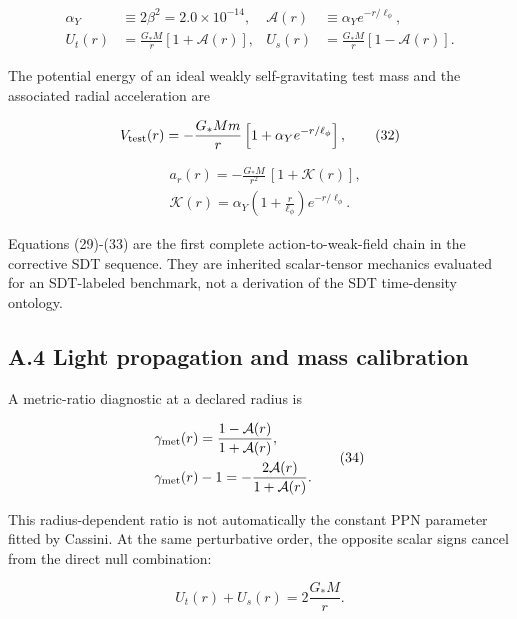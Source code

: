 \documentclass[
  american,
  11pt,
  letterpaper,
]{article}
\begin{document}
\[
\begin{aligned}
\alpha_Y&\equiv2\beta^2=2.0\times10^{-14},
&
\mathcal A(r)&\equiv\alpha_Y e^{-r/\ell_\phi},\\
U_t(r)&=\frac{G_*M}{r}[1+\mathcal A(r)],
&
U_s(r)&=\frac{G_*M}{r}[1-\mathcal A(r)].
\end{aligned}
\tag{31}
\]

The potential energy of an ideal weakly self-gravitating test mass and the associated radial acceleration are

\begin{equation}
V_{\rm test}(r)
=-\frac{G_*Mm}{r}\left[1+\alpha_Ye^{-r/\ell_\phi}\right],
\tag{32}
\end{equation}

\begin{equation}
\begin{aligned}
& a_r(r)
=-\frac{G_*M}{r^2}\,[1+\mathcal K(r)], \\
& \mathcal K(r)
=\alpha_Y\left(1+\frac{r}{\ell_\phi}\right)e^{-r/\ell_\phi}.
\end{aligned}
\tag{33}
\end{equation}

Equations (29)-(33) are the first complete action-to-weak-field chain in the corrective SDT sequence. They are inherited scalar-tensor mechanics evaluated for an SDT-labeled benchmark, not a derivation of the SDT time-density ontology.

\subsection{A.4 Light propagation and mass calibration}\label{a.4-light-propagation-and-mass-calibration}

A metric-ratio diagnostic at a declared radius is

\begin{equation}
\begin{aligned}
& \gamma_{\rm met}(r)
=\frac{1-\mathcal A(r)}{1+\mathcal A(r)}, \\
& \gamma_{\rm met}(r)-1
=-\frac{2\mathcal A(r)}{1+\mathcal A(r)}.
\end{aligned}
\tag{34}
\end{equation}

This radius-dependent ratio is not automatically the constant PPN parameter fitted by Cassini. At the same perturbative order, the opposite scalar signs cancel from the direct null combination:

\begin{equation}
U_t(r)+U_s(r)=2\frac{G_*M}{r}.
\tag{35}
\end{equation}
\end{document}
